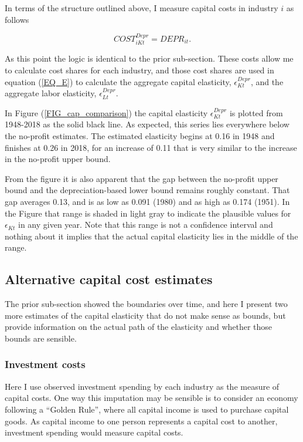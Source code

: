 \documentclass[11pt]{article}
\begin{document}
In terms of the structure outlined above, I measure capital costs in industry $i$ as follows

\begin{equation}
	COST^{Depr}_{iKt} = DEPR_{it}. 
\end{equation}

As this point the logic is identical to the prior sub-section. These costs allow me to calculate cost shares for each industry, and those cost shares are used in equation (\ref{EQ_E}) to calculate the aggregate capital elasticity, $\epsilon_{Kt}^{Depr}$, and the aggregate labor elasticity, $\epsilon_{Lt}^{Depr}$.

In Figure (\ref{FIG_cap_comparison}) the capital elasticity $\epsilon_{Kt}^{Depr}$ is plotted from 1948-2018 as the solid black line. As expected, this series lies everywhere below the no-profit estimates. The estimated elasticity begins at 0.16 in 1948 and finishes at 0.26 in 2018, for an increase of 0.11 that is very similar to the increase in the no-profit upper bound. 

From the figure it is also apparent that the gap between the no-profit upper bound and the depreciation-based lower bound remains roughly constant. That gap averages 0.13, and is as low as 0.091 (1980) and as high as 0.174 (1951). In the Figure that range is shaded in light gray to indicate the plausible values for $\epsilon_{Kt}$ in any given year. Note that this range is not a confidence interval and nothing about it implies that the actual capital elasticity lies in the middle of the range.

\subsection{Alternative capital cost estimates}
The prior sub-section showed the boundaries over time, and here I present two more estimates of the capital elasticity that do not make sense as bounds, but provide information on the actual path of the elasticity and whether those bounds are sensible.

\subsubsection{Investment costs}
Here I use observed investment spending by each industry as the measure of capital costs. One way this imputation may be sensible is to consider an economy following a ``Golden Rule'', where all capital income is used to purchase capital goods. As capital income to one person represents a capital cost to another, investment spending would measure capital costs.
\end{document}
